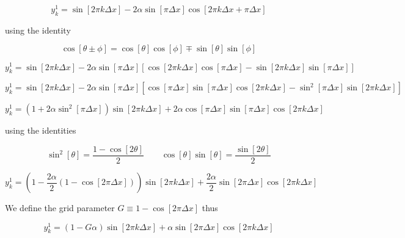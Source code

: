 \documentclass{article}
\begin{document}
\begin{homeworkProblem}
    \begin{equation}
        y_k^1 = \sin[2 \pi k \Delta x] - 2 \alpha
        \sin[\pi \Delta x] 
        \cos[2 \pi k \Delta x + \pi \Delta x ]
    \end{equation}

    \noindent using the identity

    \begin{equation}
        \cos[\theta \pm \phi] = 
        \cos[\theta] \cos[\phi] \mp \sin[\theta] \sin[\phi]
    \end{equation}

    \begin{equation}
        y_k^1 = \sin[2 \pi k \Delta x] - 2 \alpha
        \sin[\pi \Delta x] 
        [\cos[2 \pi k \Delta x] \cos[ \pi \Delta x ] - 
            \sin[2 \pi k \Delta x] \sin[ \pi \Delta x ]]
    \end{equation}

    \begin{equation}
        y_k^1 = \sin[2 \pi k \Delta x] - 2 \alpha
        \sin[\pi \Delta x] 
        [\cos[ \pi \Delta x ] \sin[ \pi \Delta x ] \cos[2 \pi k \Delta x]  - 
            \sin^2[\pi \Delta x] \sin[ 2 \pi k \Delta x ]]
    \end{equation}

    \begin{equation}
        y_k^1 = (1 + 2 \alpha \sin^2[\pi \Delta x] )\sin[2 \pi k \Delta x] 
        + 2 \alpha \cos[ \pi \Delta x ] \sin[ \pi \Delta x ] 
        \cos[2 \pi k \Delta x]      
    \end{equation}

    \noindent using the identities

    \begin{equation}
        \sin^2[\theta] = \frac{1 - \cos[2\theta]}{2}
        \,\,\,\,\,\,\,\,\,\,\,\,
        \cos[\theta] \sin[\theta] = 
        \frac{\sin[2 \theta]}{2}
    \end{equation}

    \begin{equation}
        y_k^1 = (1 - \frac{2 \alpha}{2} (1 - \cos[2 \pi \Delta x])) 
            \sin[2 \pi k \Delta x] 
            + \frac{2 \alpha}{2} \sin[2 \pi \Delta x ]
            \cos[2 \pi k \Delta x]      
    \end{equation}

    We define the grid parameter $G \equiv 1 - \cos[2 \pi \Delta x]$ thus
    
    \begin{equation} \label{eq:G}
        y_k^1 = (1 - G \alpha )\sin[2 \pi k \Delta x] 
            + \alpha \sin[2 \pi \Delta x ]
            \cos[2 \pi k \Delta x]      
    \end{equation}


\end{homeworkProblem}
\end{document}
